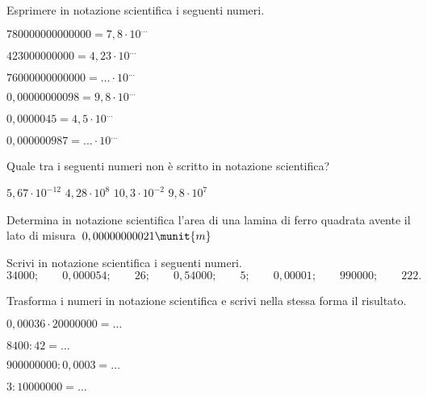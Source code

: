 \begin{esercizio}
\label{ese:3.61}
Esprimere in notazione scientifica i seguenti numeri.

\begin{htmulticols}{2}
\begin{enumeratees}
\item \(780000000000000=7,8\cdot10^{\ldots}\)
\item \(423000000000=4,23\cdot10^{\ldots}\)
\item \(76000000000000= \ldots \cdot 10^{\ldots}\)
\item \(0,00000000098=9,8\cdot10^{\ldots}\)
\item \(0,0000045=4,5\cdot10^{\ldots}\)
\item \(0,000000987= \ldots \cdot 10^{\ldots}\)
\end{enumeratees}
\end{htmulticols}
\end{esercizio}

\begin{esercizio}
\label{ese:3.62}
Quale tra i seguenti numeri non è scritto in notazione scientifica?

\quad\(5,67\cdot 10^{-12}\)\qquad
{}\quad\(4,28\cdot 10^8\)\qquad
{}\quad\(10,3\cdot 10^{-2}\)\qquad
{}\quad\(9,8\cdot 10^7\)\qquad
\end{esercizio}

\begin{esercizio}
\label{ese:3.63}
Determina in notazione scientifica l'area di una lamina di ferro quadrata
avente il lato di misura~\(0,00000000021\munit{m}\)
\end{esercizio}

\begin{esercizio}
\label{ese:3.64}
Scrivi in notazione scientifica i seguenti numeri.
\[34000;\qquad0,000054;\qquad26;\qquad0,54000;\qquad5;\qquad0,00001;
\qquad990000;\qquad222.\]
\end{esercizio}

\pagebreak

\begin{esercizio}
\label{ese:3.65}
Trasforma i numeri in notazione scientifica e scrivi nella stessa forma il 
risultato.
\begin{htmulticols}{2}
\begin{enumeratees}
\item \(0,00036\cdot20000000=\ldots\)
\item \(8400:42=\ldots\)
\item \(900000000:0,0003=\ldots\)
\item \(3:10000000=\ldots\)
\end{enumeratees}
\end{htmulticols}
\end{esercizio}

